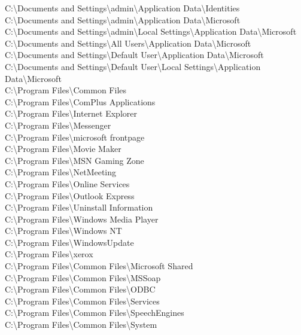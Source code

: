 \noindent C:\textbackslash Documents and Settings\textbackslash admin\textbackslash Application Data\textbackslash Identities \\
C:\textbackslash Documents and Settings\textbackslash admin\textbackslash Application Data\textbackslash Microsoft \\
C:\textbackslash Documents and Settings\textbackslash admin\textbackslash Local Settings\textbackslash Application Data\textbackslash Microsoft \\
C:\textbackslash Documents and Settings\textbackslash All Users\textbackslash Application Data\textbackslash Microsoft \\
C:\textbackslash Documents and Settings\textbackslash Default User\textbackslash Application Data\textbackslash Microsoft \\
C:\textbackslash Documents and Settings\textbackslash Default User\textbackslash Local Settings\textbackslash Application Data\textbackslash Microsoft \\
C:\textbackslash Program Files\textbackslash Common Files \\
C:\textbackslash Program Files\textbackslash ComPlus Applications \\
C:\textbackslash Program Files\textbackslash Internet Explorer \\
C:\textbackslash Program Files\textbackslash Messenger \\
C:\textbackslash Program Files\textbackslash microsoft frontpage \\
C:\textbackslash Program Files\textbackslash Movie Maker \\
C:\textbackslash Program Files\textbackslash MSN Gaming Zone \\
C:\textbackslash Program Files\textbackslash NetMeeting \\
C:\textbackslash Program Files\textbackslash Online Services \\
C:\textbackslash Program Files\textbackslash Outlook Express \\
C:\textbackslash Program Files\textbackslash Uninstall Information \\
C:\textbackslash Program Files\textbackslash Windows Media Player \\
C:\textbackslash Program Files\textbackslash Windows NT \\
C:\textbackslash Program Files\textbackslash WindowsUpdate \\
C:\textbackslash Program Files\textbackslash xerox \\
C:\textbackslash Program Files\textbackslash Common Files\textbackslash Microsoft Shared \\
C:\textbackslash Program Files\textbackslash Common Files\textbackslash MSSoap \\
C:\textbackslash Program Files\textbackslash Common Files\textbackslash ODBC \\
C:\textbackslash Program Files\textbackslash Common Files\textbackslash Services \\
C:\textbackslash Program Files\textbackslash Common Files\textbackslash SpeechEngines \\
C:\textbackslash Program Files\textbackslash Common Files\textbackslash System \\
